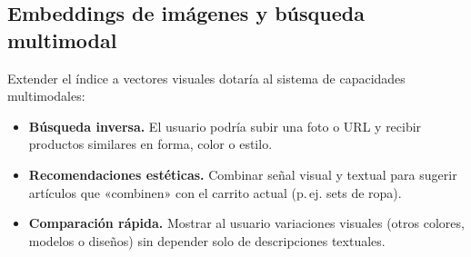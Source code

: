 \subsection{Embeddings de imágenes y búsqueda multimodal}

Extender el índice a vectores visuales dotaría al sistema de capacidades multimodales:

\begin{itemize}
    \item \textbf{Búsqueda inversa.} El usuario podría subir una foto o URL y recibir productos similares en forma, color o estilo.
    \item \textbf{Recomendaciones estéticas.} Combinar señal visual y textual para sugerir artículos que «combinen» con el carrito actual (p.\,ej. sets de ropa).
    \item \textbf{Comparación rápida.} Mostrar al usuario variaciones visuales (otros colores, modelos o diseños) sin depender solo de descripciones textuales.
\end{itemize}


